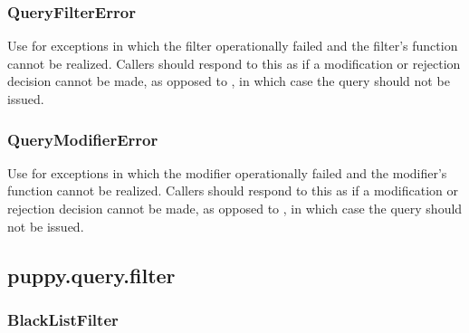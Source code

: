 \documentclass[letterpaper,10pt,english]{sphinxmanual}
\begin{document}
\subsubsection{QueryFilterError}
\label{api3.0:queryfiltererror}

\begin{fulllineitems}
\label{api3.0:puppy.query.exceptions.QueryFilterError}
Use for exceptions in which the filter operationally failed and the
filter's function cannot be realized. Callers should respond to this as if
a modification or rejection decision cannot be made, as opposed to
, in which case the query should
not be issued.

\end{fulllineitems}



\subsubsection{QueryModifierError}
\label{api3.0:querymodifiererror}

\begin{fulllineitems}
\label{api3.0:puppy.query.exceptions.QueryModifierError}
Use for exceptions in which the modifier operationally failed and the
modifier's function cannot be realized. Callers should respond to this as if
a modification or rejection decision cannot be made, as opposed to
, in which case the query should
not be issued.

\end{fulllineitems}



\subsection{puppy.query.filter}
\label{api3.0:module-puppy.query.filter}\label{api3.0:puppy-query-filter}

\subsubsection{BlackListFilter}
\label{api3.0:blacklistfilter}
\end{document}
